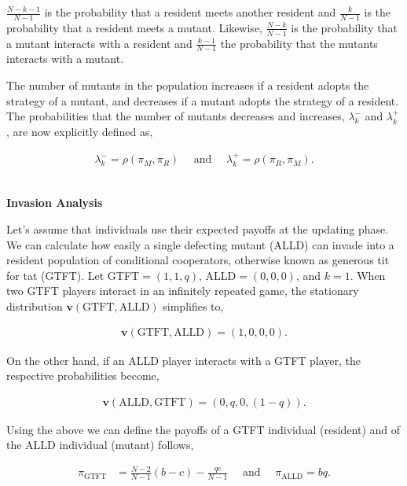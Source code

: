 \documentclass[11pt]{article}
\theoremstyle{plainCl1}
\theoremstyle{plainCl2}
\begin{document}
\(\frac{N\!-\!k\!-\!1}{N-1}\) is the probability that a resident meets another
resident and \(\frac{k}{N-1}\) is the probability that a resident meets a
mutant. Likewise, \(\frac{N-k}{N-1}\) is the probability that a mutant interacts
with a resident and \(\frac{k-1}{N-1}\) the probability that the mutants
interacts with a mutant.

The number of mutants in the population increases if a resident adopts the strategy
of a mutant, and decreases if a mutant adopts the strategy of a resident. The
probabilities that the number of mutants decreases and increases,
\(\lambda^-_k\) and \(\lambda^+_k\), are now explicitly defined as,

\begin{align*}
  \lambda^-_k \!=\!\rho(\pi_M, \pi_R) \quad \text{ and } \quad \lambda^+_k \!=\!\rho(\pi_R, \pi_M).
\end{align*}

~\\
{\bf Invasion Analysis}

Let's assume that individuals use their expected payoffs at the updating phase.
We can calculate how easily a single defecting mutant (ALLD) can invade into a
resident population of conditional cooperators, otherwise known as generous tit
for tat (GTFT). Let GTFT\(= (1, 1, q)\), ALLD\(= (0, 0, 0)\), and \(k =
1\). When two GTFT players interact in an infinitely repeated game, the
stationary distribution \(\mathbf{v}(\text{GTFT}, \text{ALLD})\) 
simplifies to,

\begin{align*}
    \mathbf{v}(\text{GTFT}, \text{ALLD}) = (1, 0, 0, 0).
\end{align*}

On the other hand, if an ALLD player interacts with a GTFT player, the
respective probabilities become,

\begin{align*}
  \mathbf{v}(\text{ALLD}, \text{GTFT}) = (0, q, 0, (1 - q)).
\end{align*}

Using the above we can define the payoffs of a GTFT individual (resident)
and of the ALLD individual (mutant) follows,

\begin{align*}
  \displaystyle \pi_{\text{GTFT}} & = \displaystyle \frac{N\!-\!2}{N-1} (b - c)  -	\displaystyle\frac{q c}{N-1} \quad \text{ and } \quad \displaystyle \pi_{\text{ALLD}}  = \displaystyle b q.
\end{align*}
\end{document}

